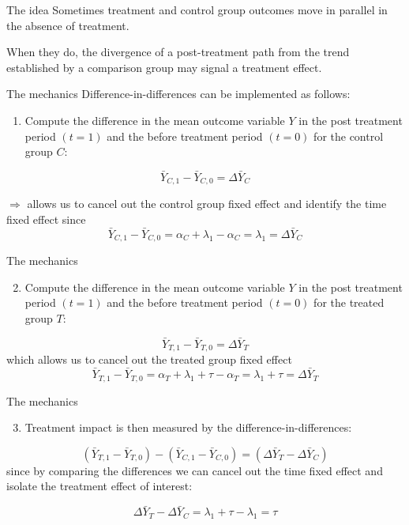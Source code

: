 \documentclass[
  ignorenonframetext,
]{beamer}
\providecommand{\tightlist}{%
  \setlength{\itemsep}{0pt}\setlength{\parskip}{0pt}}
\begin{document}
\begin{frame}{The idea}
\protect\hypertarget{the-idea}{}
Sometimes treatment and control group outcomes move in parallel in the
absence of treatment.

When they do, the divergence of a post-treatment path from the trend
established by a comparison group may signal a treatment effect.
\end{frame}

\begin{frame}{The mechanics}
\protect\hypertarget{the-mechanics}{}
Difference-in-differences can be implemented as follows:

\begin{enumerate}
[1)]
\tightlist
\item
  Compute the difference in the mean outcome variable \(Y\) in the post
  treatment period \((t=1)\) and the before treatment period \((t=0)\)
  for the control group \(C\):
\end{enumerate}

\[
\bar{Y}_{C,1}-\bar{Y}_{C,0}=\Delta \bar{Y}_C
\]

\(\Rightarrow\) allows us to cancel out the control group fixed effect
and identify the time fixed effect since \[
\bar{Y}_{C,1}-\bar{Y}_{C,0}=\alpha_C+\lambda_1-\alpha_C=\lambda_1=\Delta \bar{Y}_C
\]
\end{frame}

\begin{frame}{The mechanics}
\protect\hypertarget{the-mechanics-1}{}
\begin{enumerate}
[1)]
\setcounter{enumi}{1}
\tightlist
\item
  Compute the difference in the mean outcome variable \(Y\) in the post
  treatment period \((t=1)\) and the before treatment period \((t=0)\)
  for the treated group \(T\):
\end{enumerate}

\[
\bar{Y}_{T,1}-\bar{Y}_{T,0}=\Delta \bar{Y}_T
\] which allows us to cancel out the treated group fixed effect \[
\bar{Y}_{T,1}-\bar{Y}_{T,0}=\alpha_T+\lambda_1+\tau-\alpha_T=\lambda_1+\tau=\Delta \bar{Y}_T
\]
\end{frame}

\begin{frame}{The mechanics}
\protect\hypertarget{the-mechanics-2}{}
\begin{enumerate}
[1)]
\setcounter{enumi}{2}
\tightlist
\item
  Treatment impact is then measured by the difference-in-differences:
\end{enumerate}

\[
(\bar{Y}_{T,1}-\bar{Y}_{T,0})-(\bar{Y}_{C,1}-\bar{Y}_{C,0})=(\Delta \bar{Y}_T-\Delta \bar{Y}_C)
\] since by comparing the differences we can cancel out the time fixed
effect and isolate the treatment effect of interest:

\[
\Delta \bar{Y}_T-\Delta \bar{Y}_C=\lambda_1+\tau-\lambda_1=\tau
\]
\end{frame}
\end{document}
